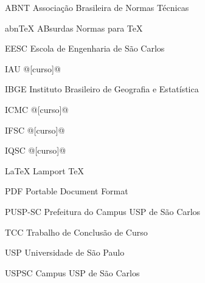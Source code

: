 \begin{siglas}
    \item[ABNT] Associação Brasileira de Normas T\'ecnicas
    \item[abnTeX] ABsurdas Normas para TeX
	\item[EESC] Escola de Engenharia de São Carlos
	\item[IAU] @[curso]@
	\item[IBGE] Instituto Brasileiro de Geografia e Estatística
	\item[ICMC] @[curso]@
	\item[IFSC] @[curso]@
	\item[IQSC] @[curso]@
	\item[LaTeX] Lamport TeX
	\item[PDF] Portable Document Format
	\item[PUSP-SC] Prefeitura do Campus USP de São Carlos
	\item[TCC] Trabalho de Conclusão de Curso
	\item[USP] Universidade de São Paulo
	\item[USPSC] Campus USP de São Carlos
\end{siglas}
